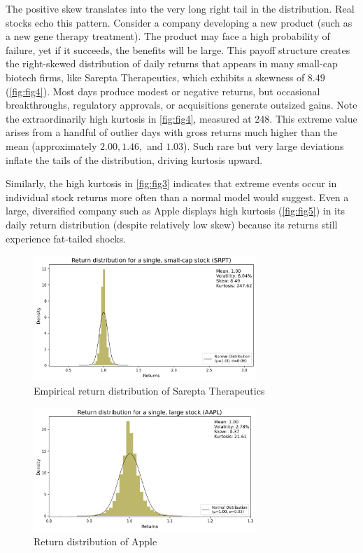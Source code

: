 The positive skew translates into the very long right tail in the distribution. Real stocks echo this pattern. Consider a company developing a new product (such as a new gene therapy treatment). The product may face a high probability of failure, yet if it succeeds, the benefits will be large. This payoff structure creates the right-skewed distribution of daily returns that appears in many small-cap biotech firms, like Sarepta Therapeutics, which exhibits a skewness of $8.49$ (\autoref{fig:fig4}). Most days produce modest or negative returns, but occasional breakthroughs, regulatory approvals, or acquisitions generate outsized gains. 
Note the extraordinarily high kurtosis in \autoref{fig:fig4}, measured at 248. This extreme value arises from a handful of outlier days with gross returns much higher than the mean (approximately $2.00, 1.46,$ and $1.03$). Such rare but very large deviations inflate the tails of the distribution, driving kurtosis upward.

Similarly, the high kurtosis in \autoref{fig:fig3} indicates that extreme events occur in individual stock returns more often than a normal model would suggest. Even a large, diversified company such as Apple displays high kurtosis (\autoref{fig:fig5}) in its daily return distribution (despite relatively low skew) because its returns still experience fat-tailed shocks. 

\begin{figure}[h]
    \centering
    \includegraphics[width=0.75\textwidth]{fig4.png}
    \caption{Empirical return distribution of Sarepta Therapeutics}
    \label{fig:fig4}
\end{figure}

\begin{figure}[h]
    \centering
    \includegraphics[width=0.75\textwidth]{fig5.png}
    \caption{Return distribution of Apple}
    \label{fig:fig5}
\end{figure}

